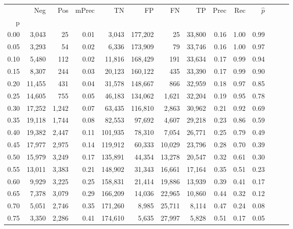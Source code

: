 \begin{tabular}{rrrrrrrrrrrrrr}
\toprule
{} &     Neg &    Pos & mPrec &       TN &       FP &      FN &      TP &  Prec &   Rec & $\hat{p}$ \\
p    &         &        &       &          &          &         &         &       &       &           \\
\midrule
0.00 &   3,043 &     25 &  0.01 &    3,043 &  177,202 &      25 &  33,800 &  0.16 &  1.00 &      0.99 \\
0.05 &   3,293 &     54 &  0.02 &    6,336 &  173,909 &      79 &  33,746 &  0.16 &  1.00 &      0.97 \\
0.10 &   5,480 &    112 &  0.02 &   11,816 &  168,429 &     191 &  33,634 &  0.17 &  0.99 &      0.94 \\
0.15 &   8,307 &    244 &  0.03 &   20,123 &  160,122 &     435 &  33,390 &  0.17 &  0.99 &      0.90 \\
0.20 &  11,455 &    431 &  0.04 &   31,578 &  148,667 &     866 &  32,959 &  0.18 &  0.97 &      0.85 \\
0.25 &  14,605 &    755 &  0.05 &   46,183 &  134,062 &   1,621 &  32,204 &  0.19 &  0.95 &      0.78 \\
0.30 &  17,252 &  1,242 &  0.07 &   63,435 &  116,810 &   2,863 &  30,962 &  0.21 &  0.92 &      0.69 \\
0.35 &  19,118 &  1,744 &  0.08 &   82,553 &   97,692 &   4,607 &  29,218 &  0.23 &  0.86 &      0.59 \\
0.40 &  19,382 &  2,447 &  0.11 &  101,935 &   78,310 &   7,054 &  26,771 &  0.25 &  0.79 &      0.49 \\
0.45 &  17,977 &  2,975 &  0.14 &  119,912 &   60,333 &  10,029 &  23,796 &  0.28 &  0.70 &      0.39 \\
0.50 &  15,979 &  3,249 &  0.17 &  135,891 &   44,354 &  13,278 &  20,547 &  0.32 &  0.61 &      0.30 \\
0.55 &  13,011 &  3,383 &  0.21 &  148,902 &   31,343 &  16,661 &  17,164 &  0.35 &  0.51 &      0.23 \\
0.60 &   9,929 &  3,225 &  0.25 &  158,831 &   21,414 &  19,886 &  13,939 &  0.39 &  0.41 &      0.17 \\
0.65 &   7,378 &  3,079 &  0.29 &  166,209 &   14,036 &  22,965 &  10,860 &  0.44 &  0.32 &      0.12 \\
0.70 &   5,051 &  2,746 &  0.35 &  171,260 &    8,985 &  25,711 &   8,114 &  0.47 &  0.24 &      0.08 \\
0.75 &   3,350 &  2,286 &  0.41 &  174,610 &    5,635 &  27,997 &   5,828 &  0.51 &  0.17 &      0.05 \\

\end{tabular}
